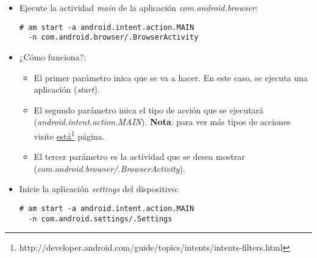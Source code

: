\begin{itemize}
    \item Ejecute la actividad \textit{main} de la aplicación \emph{com.android.browser}:
    \begin{lstlisting}
# am start -a android.intent.action.MAIN 
  -n com.android.browser/.BrowserActivity
    \end{lstlisting}
    \item ¿Cómo funciona?:
    \begin{itemize}
  \item El primer parámetro inica que se va a hacer. En este caso, se ejecuta una aplicación (\emph{start}).
  
  \item El segundo parámetro inica el tipo de acción que se ejecutará (\emph{android.intent.action.MAIN}). \textbf{Nota}: para ver más tipos de acciones visite \href{http://developer.android.com/guide/topics/intents/intents-filters.html}{está}\footnote{http://developer.android.com/guide/topics/intents/intents-filters.html} página.
  
  \item El tercer parámetro es la actividad que se desea mostrar 
  (\emph{com.android.browser/.BrowserActivity}).
    \end{itemize}

    \item Inicie la aplicación \emph{settings} del dispositivo:
    \begin{lstlisting}
# am start -a android.intent.action.MAIN 
  -n com.android.settings/.Settings
    \end{lstlisting}
\end{itemize}

